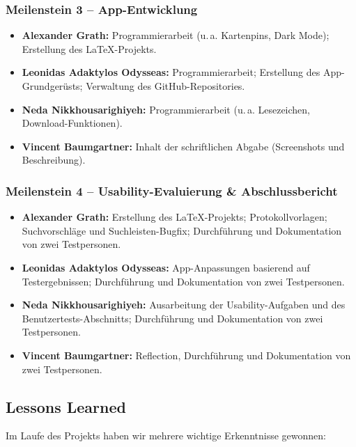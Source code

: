 \subsubsection*{Meilenstein 3 – App-Entwicklung}

\begin{itemize}
    \item \textbf{Alexander Grath:} Programmierarbeit (u.\,a. Kartenpins, Dark Mode); Erstellung des \LaTeX-Projekts.
    \item \textbf{Leonidas Adaktylos Odysseas:} Programmierarbeit; Erstellung des App-Grundgerüsts; Verwaltung des GitHub-Repositories.
    \item \textbf{Neda Nikkhousarighiyeh:} Programmierarbeit (u.\,a. Lesezeichen, Download-Funktionen).
    \item \textbf{Vincent Baumgartner:} Inhalt der schriftlichen Abgabe (Screenshots und Beschreibung).
\end{itemize}

\subsubsection*{Meilenstein 4 – Usability-Evaluierung \& Abschlussbericht}

\begin{itemize}
    \item \textbf{Alexander Grath:} Erstellung des \LaTeX-Projekts; Protokollvorlagen; Suchvorschläge und Suchleisten-Bugfix; Durchführung und Dokumentation von zwei Testpersonen.
    \item \textbf{Leonidas Adaktylos Odysseas:} App-Anpassungen basierend auf Testergebnissen; Durchführung und Dokumentation von zwei Testpersonen.
    \item \textbf{Neda Nikkhousarighiyeh:} Ausarbeitung der Usability-Aufgaben und des Benutzertests-Abschnitts; Durchführung und Dokumentation von zwei Testpersonen.
    \item \textbf{Vincent Baumgartner:} Reflection,  Durchführung und Dokumentation von zwei Testpersonen.
\end{itemize}

\subsection{Lessons Learned}

Im Laufe des Projekts haben wir mehrere wichtige Erkenntnisse gewonnen:

